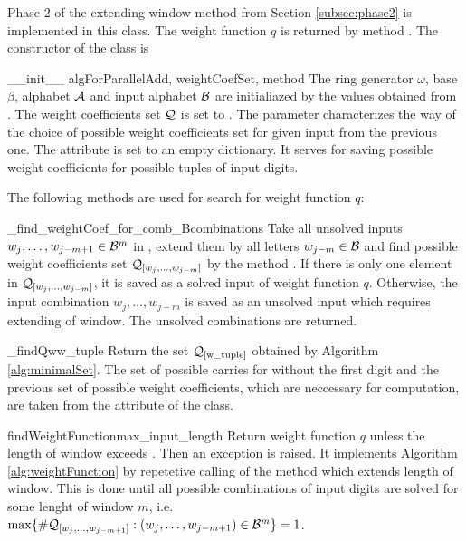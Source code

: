 Phase 2 of the extending window method from Section \ref{subsec:phase2} is implemented in this class. The weight function $q$ is returned by method . The constructor of the class is

\begin{method}{\_\_init\_\_}{ algForParallelAdd, weightCoefSet, method}
The ring generator $\omega$, base $\beta$, alphabet $\mathcal{A}$ and input alphabet $\mathcal{B}$ are initialiazed by the values obtained from . The weight coefficients set $\mathcal{Q}$ is set to . The parameter  characterizes the way of the choice of possible weight coefficients set for given input from the previous one. The attribute  is set to an empty dictionary. It serves for saving possible weight coefficients for possible tuples of input digits.
\end{method}

The following methods are used for search for weight function $q$:

\begin{method}{\_find\_weightCoef\_for\_comb\_B}{combinations}
Take all unsolved inputs $w_j,\dots, w_{j-m+1} \in \mathcal{B}^m$ in , extend them by all letters $w_{j-m}\in\mathcal{B}$ and find possible weight coefficients set $\mathcal{Q}_{[w_j,\dots, w_{j-m}]}$ by the method . If there is only one element in $\mathcal{Q}_{[w_j,\dots, w_{j-m}]}$, it is saved as a solved input of weight function $q$. Otherwise, the input combination $w_j,\dots, w_{j-m}$ is saved as an unsolved input which requires extending of window. The unsolved combinations are returned.  
\end{method}


\begin{method}{\_findQw}{w\_tuple}
Return the set $\mathcal{Q}_{[\text{w\_tuple}]}$ obtained by Algorithm \ref{alg:minimalSet}. The set of possible carries for  without the first digit and the previous set of possible weight coefficients, which are neccessary for computation, are taken from the attribute  of the class.
\end{method}


\begin{method}{findWeightFunction}{max\_input\_length}
Return weight function $q$ unless the length of window exceeds . Then an exception is raised. It implements Algorithm \ref{alg:weightFunction} by repetetive calling of the method  which extends length of window. This is done until all possible combinations of input digits are solved for some lenght of window $m$, i.e. $\max\{\#\mathcal{Q}_{[w_j,\dots, w_{j-m+1}]}:(w_j,\dots, w_{j-m+1}) \in \mathcal{B}^m \} = 1$.
\end{method}


